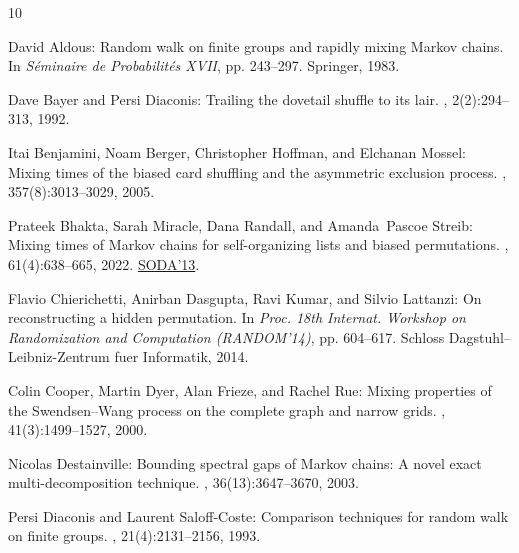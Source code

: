 \documentclass[11pt]{article}
\begin{document}
\tocrefpdfbookmark
\begin{thebibliography}{10}

{\sc David Aldous}: Random walk on finite groups and rapidly mixing {M}arkov
  chains.
\newblock In {\em S{\'e}minaire de Probabilit{\'e}s XVII}, pp. 243--297.
  Springer, 1983.

{\sc Dave Bayer and Persi Diaconis}: Trailing the dovetail shuffle to its lair.
, 2(2):294--313, 1992.

{\sc Itai Benjamini, Noam Berger, Christopher Hoffman, and Elchanan Mossel}:
  Mixing times of the biased card shuffling and the asymmetric exclusion
  process.
, 357(8):3013--3029, 2005.
\newblock [\epfmtdoi{10.1090/S0002-9947-05-03610-X}]

{\sc Prateek Bhakta, Sarah Miracle, Dana Randall, and Amanda~Pascoe Streib}:
  Mixing times of {M}arkov chains for self-organizing lists and biased
  permutations.
, 61(4):638--665, 2022.
\newblock \prelim \href{https://doi.org/10.1137/1.9781611973105.1}{SODA'13}.

{\sc Flavio Chierichetti, Anirban Dasgupta, Ravi Kumar, and Silvio Lattanzi}:
  On reconstructing a hidden permutation.
\newblock In {\em Proc. 18th Internat. Workshop on Randomization and
  Computation (RANDOM'14)}, pp. 604--617. Schloss Dagstuhl--Leibniz-Zentrum
  fuer Informatik, 2014.

{\sc Colin Cooper, Martin Dyer, Alan Frieze, and Rachel Rue}: Mixing properties
  of the {S}wendsen--{W}ang process on the complete graph and narrow grids.
, 41(3):1499--1527, 2000.
\newblock [\epfmtdoi{10.1063/1.533194}]

{\sc Nicolas Destainville}: Bounding spectral gaps of {M}arkov chains: {A}
  novel exact multi-decomposition technique.
, 36(13):3647--3670, 2003.
\newblock [\epfmtdoi{10.1088/0305-4470/36/13/301}]

{\sc Persi Diaconis and Laurent Saloff-Coste}: Comparison techniques for random
  walk on finite groups.
, 21(4):2131--2156, 1993.


\end{thebibliography}
\end{document}
